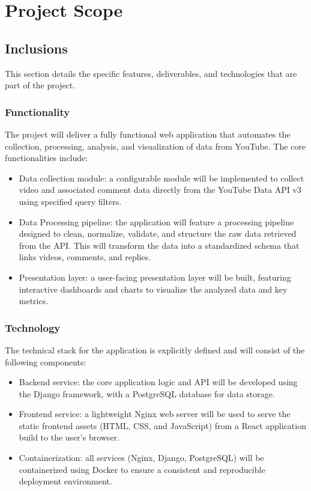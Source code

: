 \section{Project Scope}

\subsection{Inclusions}

This section details the specific features, deliverables, and technologies that are part of the project.

\subsubsection{Functionality}

The project will deliver a fully functional web application that automates the collection, processing, analysis, and visualization of data from YouTube. The core functionalities include:

\begin{itemize}
	\item Data collection module: a configurable module will be implemented to collect video and associated comment data directly from the YouTube Data API v3 using specified query filters.

	\item Data Processing pipeline: the application will feature a processing pipeline designed to clean, normalize, validate, and structure the raw data retrieved from the API. This will transform the data into a standardized schema that links videos, comments, and replies.

	\item Presentation layer: a user-facing presentation layer will be built, featuring interactive dashboards and charts to visualize the analyzed data and key metrics.
\end{itemize}

\subsubsection{Technology}

The technical stack for the application is explicitly defined and will consist of the following components:

\begin{itemize}
	\item Backend service: the core application logic and API will be developed using the Django framework, with a PostgreSQL database for data storage.

	\item Frontend service: a lightweight Nginx web server will be used to serve the static frontend assets (HTML, CSS, and JavaScript) from a React application build to the user's browser.

	\item Containerization: all services (Nginx, Django, PostgreSQL) will be containerized using Docker to ensure a consistent and reproducible deployment environment.
\end{itemize}

